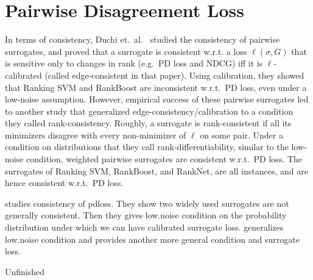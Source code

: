 \section{Pairwise Disagreement Loss}\label{sec:pdloss}

In terms of consistency, Duchi et.\ al.~\cite{duchi2010ranking}
studied the consistency of pairwise
surrogates, and proved that a surrogate is consistent w.r.t. a
loss $\ell(\sigma, G)$ that is sensitive only to changes in rank
(e.g.\ PD loss and NDCG) iff it is $\ell$-calibrated (called edge-consistent
in that paper). Using calibration, they showed that Ranking SVM and RankBoost
are inconsistent w.r.t.\ PD loss, even under a low-noise assumption.
However, empirical success of these pairwise surrogates led to another study
that generalized edge-consistency/calibration to a condition they called
rank-consistency.
Roughly, a surrogate is rank-consistent if all its minimizers
disagree with every non-minimizer of $\ell$ on some pair. Under a condition
on distributions that they call rank-differentiability,
similar to the low-noise condition, weighted pairwise surrogates are consistent
w.r.t.\ PD loss. The surrogates of Ranking SVM, RankBoost, and RankNet, are
all instances, and are hence consistent w.r.t.\ PD loss.


\cite{duchi2010ranking} studies consistency of pdloss. They show two widely used surrogates are not generally consistent. Then they gives low.noise condition on the probability distribution under which we can have calibrated surrogate loss. \cite{ramaswamy2013convex} generalizes low.noise condition and provides another more general condition and surrogate loss. 

Unfinished

